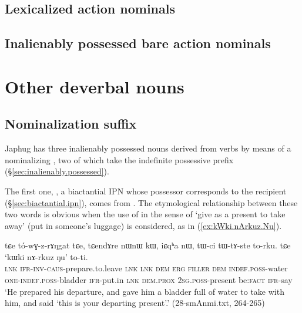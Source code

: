\subsection{Lexicalized action nominals}  

  \subsection{Inalienably possessed bare action nominals} \label{sec:bare.action.nominals}
\section{Other deverbal nouns}


\subsection{Nominalization  suffix} \label{sec:z.nmlz}
Japhug has three inalienably possessed nouns derived from verbs by means of a nominalizing , two of which take the indefinite possessive prefix  (§\ref{sec:inalienably.possessed}).

The first one, , a biactantial IPN whose possessor corresponds to the recipient (§\ref{sec:biactantial.ipn}), comes from . The etymological relationship  between these two words is obvious when the use of   in the sense of `give as a present to take away' (put in someone's luggage) is considered, as in (\ref{ex:kWki.nArkuz.Nu}).

\begin{exe}
\ex \label{ex:kWki.nArkuz.Nu}
\gll tɕe tó-wɣ-z-rɤŋgat tɕe, tɕendɤre nɯnɯ kɯ, iɕqʰa nɯ,  tɯ-ci tɯ-tɤ-ste to-rku. tɕe `kɯki nɤ-rkuz ŋu' to-ti. \\
\textsc{lnk} \textsc{ifr}-\textsc{inv}-\textsc{caus}-prepare.to.leave \textsc{lnk} \textsc{lnk} \textsc{dem} \textsc{erg} \textsc{filler} \textsc{dem} \textsc{indef}.\textsc{poss}-water \textsc{one}-\textsc{indef}.\textsc{poss}-bladder \textsc{ifr}-put.in \textsc{lnk} \textsc{dem}.\textsc{prox} \textsc{2sg}.\textsc{poss}-present be:\textsc{fact} \textsc{ifr}-say \\
\glt `He prepared his departure, and gave him a bladder full of water to take with him, and said `this is your departing present'.' (28-smAnmi.txt, 264-265)
\end{exe}


